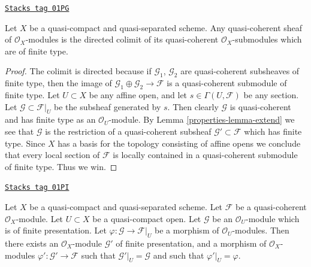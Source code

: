 \begin{lemma}
\label{properties-lemma-quasi-coherent-colimit-finite-type}
\href{https://stacks.math.columbia.edu/tag/01PG}{\texttt{Stacks tag 01PG}}

Let $X$ be a quasi-compact and quasi-separated scheme.
Any quasi-coherent sheaf of $\mathcal{O}_X$-modules
is the directed colimit of its quasi-coherent
$\mathcal{O}_X$-submodules which are of finite type.
\end{lemma}

\begin{proof}

The colimit is directed because if $\mathcal{G}_1$, $\mathcal{G}_2$
are quasi-coherent subsheaves of finite type, then the image of
$\mathcal{G}_1 \oplus \mathcal{G}_2 \to \mathcal{F}$ is
a quasi-coherent submodule of finite type.
Let $U \subset X$ be any affine open, and let
$s \in \Gamma(U, \mathcal{F})$ be any section.
Let $\mathcal{G} \subset \mathcal{F}|_U$ be the
subsheaf generated by $s$. Then clearly $\mathcal{G}$
is quasi-coherent and has finite type as an $\mathcal{O}_U$-module.
By Lemma \ref{properties-lemma-extend} we see that $\mathcal{G}$ is the restriction
of a quasi-coherent subsheaf $\mathcal{G}' \subset \mathcal{F}$
which has finite type. Since $X$ has a basis for the topology consisting
of affine opens we conclude that every local section of
$\mathcal{F}$ is locally contained in a quasi-coherent submodule
of finite type. Thus we win.
\end{proof}

\begin{lemma}
\label{properties-lemma-extend-finite-presentation}
\href{https://stacks.math.columbia.edu/tag/01PI}{\texttt{Stacks tag 01PI}}

Let $X$ be a quasi-compact and quasi-separated scheme.
Let $\mathcal{F}$ be a quasi-coherent $\mathcal{O}_X$-module.
Let $U \subset X$ be a quasi-compact open.
Let $\mathcal{G}$ be an $\mathcal{O}_U$-module which is of finite presentation.
Let $\varphi : \mathcal{G} \to \mathcal{F}|_U$ be a morphism of
$\mathcal{O}_U$-modules.
Then there exists an $\mathcal{O}_X$-module
$\mathcal{G}'$ of finite presentation, and a morphism
of $\mathcal{O}_X$-modules $\varphi' : \mathcal{G}' \to \mathcal{F}$
such that $\mathcal{G}'|_U = \mathcal{G}$ and such that
$\varphi'|_U = \varphi$.
\end{lemma}


